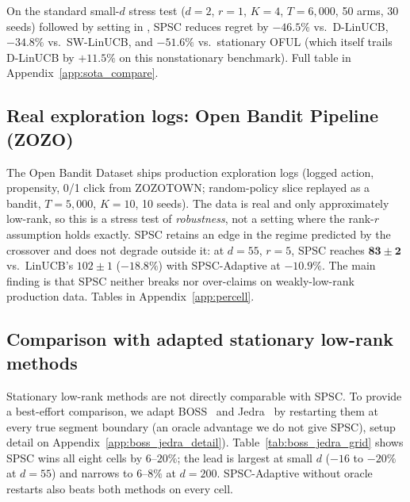 \documentclass{article}
\begin{document}
On the standard small-$d$ stress test ($d{=}2$, $r{=}1$, $K{=}4$,
$T{=}6{,}000$, 50 arms, 30 seeds) followed by setting in \citep{russac2019weighted}, SPSC reduces regret by
$\mathbf{-46.5\%}$ vs.\ D-LinUCB, $-34.8\%$ vs.\ SW-LinUCB, and
$\mathbf{-51.6\%}$ vs.\ stationary OFUL (which itself trails D-LinUCB
by $+11.5\%$ on this nonstationary benchmark). Full table in
Appendix~\ref{app:sota_compare}.

\subsection{Real exploration logs: Open Bandit Pipeline (ZOZO)}
\label{sec:exp_openbandit}

The Open Bandit Dataset \citep{saito2020open} ships production
exploration logs (logged action, propensity, 0/1 click from
ZOZOTOWN; random-policy slice replayed as a bandit, $T{=}5{,}000$,
$K{=}10$, 10 seeds). The data is real and only approximately
low-rank, so this is a stress test of \emph{robustness}, not a
setting where the rank-$r$ assumption holds exactly. SPSC retains
an edge in the regime predicted by the crossover and does not
degrade outside it: at $d{=}55$, $r{=}5$, SPSC reaches
$\mathbf{83\pm 2}$ vs.\ LinUCB's $102\pm 1$ ($-18.8\%$) with
SPSC-Adaptive at $-10.9\%$. The main finding is that SPSC neither
breaks nor over-claims on weakly-low-rank production data. Tables in
Appendix~\ref{app:percell}.

\subsection{Comparison with adapted stationary low-rank methods}
\label{sec:exp_boss_jedra}

Stationary low-rank methods are not directly comparable with SPSC.
To provide a best-effort comparison, we adapt
BOSS~\citep{duong2024beyond} and Jedra~\citep{jedra2024low} by
restarting them at every true segment boundary (an oracle advantage
we do not give SPSC), setup detail on Appendix~\ref{app:boss_jedra_detail}).
Table~\ref{tab:boss_jedra_grid} shows SPSC wins all eight cells by
$6$--$20\%$; the lead is largest at small $d$ ($-16$ to $-20\%$ at
$d{=}55$) and narrows to $6$--$8\%$ at $d{=}200$. SPSC-Adaptive
without oracle restarts also beats both methods on every cell.
\end{document}
